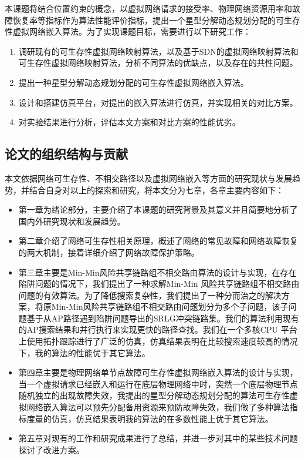 本课题将结合位置约束的概念，以虚拟网络请求的接受率、物理网络资源用率和故障恢复率等指标作为算法性能评价指标，提出一个星型分解动态规划分配的可生存性虚拟网络嵌入算法。为了实现课题目标，需要进行以下研究工作：
\begin{enumerate}
  \item 调研现有的可生存性虚拟网络映射算法，以及基于SDN的虚拟网络映射算法和可生存性虚拟网络映射算法，分析不同算法的优缺点，以及存在的共性问题。
  \item 提出一种星型分解动态规划分配的可生存性虚拟网络嵌入算法。
  \item 设计和搭建仿真平台，对提出的嵌入算法进行仿真，并实现相关的对比方案。
  \item 对实验结果进行分析，评估本文方案和对比方案的性能优劣。
\end{enumerate}


\subsection{论文的组织结构与贡献}
本文依据网络可生存性、不相交路径以及虚拟网络嵌入等方面的研究现状与发展趋势，并结合自身对以上的探索和研究，将本文分为七章，各章主要内容如下：
\begin{itemize}
  \item 第一章为绪论部分，主要介绍了本课题的研究背景及其意义并且简要地分析了国内外研究现状和发展趋势。
  \item 第二章介绍了网络可生存性相关原理，概述了网络的常见故障和网络故障恢复的两大机制，接着详细介绍了网络故障保护策略。
  \item 第三章主要是Min-Min风险共享链路组不相交路由算法的设计与实现，在存在陷阱问题的情况下，我们提出了一种求解Min-Min 风险共享链路组不相交路由问题的有效算法。为了降低搜索复杂性，我们提出了一种分而治之的解决方案，将原Min-Min风险共享链路组不相交路由问题划分为多个子问题，该子问题基于从AP路径遇到陷阱问题导出的SRLG冲突链路集。我们的算法利用现有的AP搜索结果和并行执行来实现更快的路径查找。我们在一个多核CPU 平台上使用拓扑跟踪进行了广泛的仿真，仿真结果表明在比较搜索速度较高的情况下，我的算法的性能优于其它算法。
  \item 第四章主要是物理网络单节点故障可生存性虚拟网络嵌入算法的设计与实现，当一个虚拟请求已经嵌入和运行在底层物理网络中时，突然一个底层物理节点随机独立的出现故障失效，我提出的星型分解动态规划分配的算法可生存性虚拟网络嵌入算法可以预先分配备用资源来预防故障失效，我们做了多种算法指标度量的仿真，仿真结果表明我的算法的在多数性能上优于其它算法。
  \item 第五章对现有的工作和研究成果进行了总结，并进一步对其中的某些技术问题探讨了改进方案。
\end{itemize}
